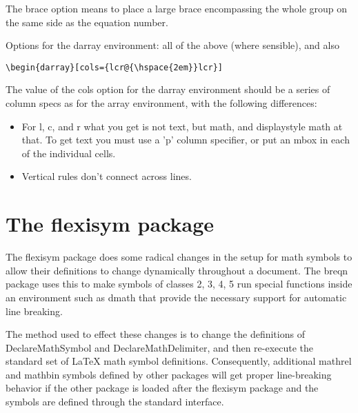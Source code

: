 \documentclass{article}
\def\latex/{{\protect\LaTeX}}
\newcommand{\ntt}{\normalfont\ttfamily}
\DeclareRobustCommand{\cs}[1]{{\ntt\ttbackslash#1}}
\let\cn=\cs
\DeclareRobustCommand{\pkg}[1]{{\ntt#1}}
\let\opt=\pkg \let\env=\pkg \let\fn=\pkg
\begin{document}
The \opt{brace} option means to place a large brace encompassing the
whole group on the same side as the equation number.

Options for the \env{darray} environment: all of the above (where
sensible), and also
\begin{verbatim}
\begin{darray}[cols={lcr@{\hspace{2em}}lcr}]
\end{verbatim}
The value of the \opt{cols} option for the darray environment should be
a series of column specs as for the \env{array} environment, with the
following differences:
\begin{itemize}
\item For l, c, and r what you get is not text, but math, and
displaystyle math at that. To get text you must use a 'p' column
specifier, or put an \cn{mbox} in each of the individual cells.

\item Vertical rules don't connect across lines.
\end{itemize}

\section{The \pkg{flexisym} package}\label{flexisym}

The \pkg{flexisym} package does some radical changes in the setup for
math symbols to allow their definitions to change dynamically throughout
a document. The \pkg{breqn} package uses this to make symbols of classes
2, 3, 4, 5 run special functions inside an environment such as
\env{dmath} that provide the necessary support for automatic line
breaking.

The method used to effect these changes is to change the definitions of
\cn{DeclareMathSymbol} and \cn{DeclareMathDelimiter}, and then
re-execute the standard set of \latex/ math symbol definitions.
Consequently, additional mathrel and mathbin symbols defined by other
packages will get proper line-breaking behavior if the other package is
loaded after the \pkg{flexisym} package and the symbols are defined
through the standard interface.
\end{document}
